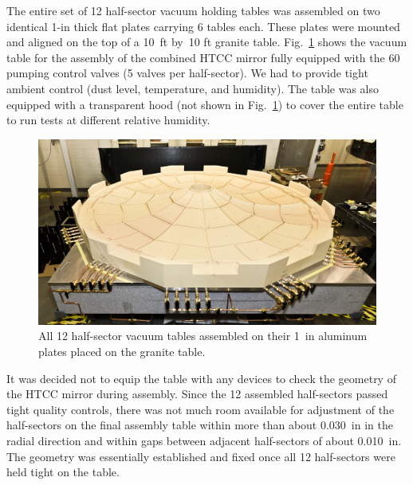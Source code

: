 % 

The entire set of 12 half-sector vacuum holding tables was assembled on two identical 1-in thick flat plates
carrying 6 tables each. These plates were mounted and aligned on the top of a 10~ft by~10 ft granite table.
Fig.~\ref{fig:Twelve_Foam_Vacuum_Tables} shows the vacuum table for the assembly of the combined HTCC
mirror fully equipped with the 60 pumping control valves (5 valves per half-sector). We had to provide tight
ambient control (dust level, temperature, and humidity). The table was also equipped with a transparent hood (not
shown in Fig.~\ref{fig:Twelve_Foam_Vacuum_Tables}) to cover the entire table to run tests at different relative
humidity.   

\begin{figure}[ht]
    \centering
    \includegraphics[width=1.0\linewidth]{images/Twelve_Foam_Vacuum_Tables.jpg}
    \caption{All 12 half-sector vacuum tables assembled on their 1~in aluminum plates placed on the granite table.}
    \label{fig:Twelve_Foam_Vacuum_Tables}
\end{figure}

It was decided not to equip the table with any devices to check the geometry of the HTCC mirror during assembly.
Since the 12 assembled half-sectors passed tight quality controls, there was not much room available for adjustment
of the half-sectors on the final assembly table within more than about 0.030~in in the radial direction and within gaps
between adjacent half-sectors of about 0.010~in. The geometry was essentially established and fixed once all 12
half-sectors were held tight on the table.

